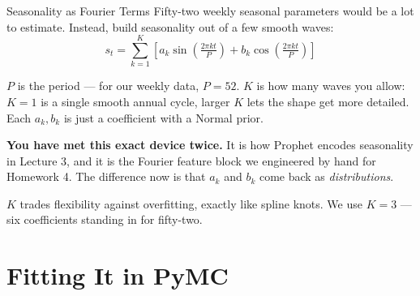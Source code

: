 \documentclass[aspectratio=169, 11pt]{beamer}
\begin{document}
\begin{frame}{Seasonality as Fourier Terms}
  Fifty-two weekly seasonal parameters would be a lot to estimate. Instead, build seasonality out
  of a few smooth waves:
  \[
    s_t = \sum_{k=1}^{K}\left[a_k \sin\!\left(\tfrac{2\pi k t}{P}\right)
                             + b_k \cos\!\left(\tfrac{2\pi k t}{P}\right)\right]
  \]
  \vspace{-0.25cm}

  $P$ is the period --- for our weekly data, $P = 52$. $K$ is how many waves you allow: $K=1$ is
  a single smooth annual cycle, larger $K$ lets the shape get more detailed. Each $a_k, b_k$ is
  just a coefficient with a Normal prior.

  \begin{keybox}
    \textbf{You have met this exact device twice.} It is how Prophet encodes seasonality in
    Lecture 3, and it is the Fourier feature block we engineered by hand for Homework 4. The
    difference now is that $a_k$ and $b_k$ come back as \emph{distributions}.
  \end{keybox}

  \vspace{0.1cm}
  $K$ trades flexibility against overfitting, exactly like spline knots. We use $K = 3$ --- six
  coefficients standing in for fifty-two.
\end{frame}

\section{Fitting It in PyMC}

\end{document}

